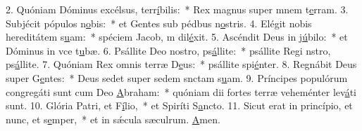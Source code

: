 2. Quóniam Dóminus excélsus, terr\uline{í}bilis:~* Rex magnus super mnem t\uline{e}rram.
3. Subjécit pópulos n\uline{o}bis:~* et Gentes sub pédbus n\uline{o}stris.
4. Elégit nobis hereditátem s\uline{u}am:~* spéciem Jacob, m dil\uline{é}xit.
5. Ascéndit Deus in j\uline{ú}bilo:~* et Dóminus in vce t\uline{u}bæ.
6. Psállite Deo nostro, ps\uline{á}llite:~* psállite Regi nstro, ps\uline{á}llite.
7. Quóniam Rex omnis terræ D\uline{e}us:~* psállite spi\uline{é}nter.
8. Regnábit Deus super G\uline{e}ntes:~* Deus sedet super sedem snctam s\uline{u}am.
9. Príncipes populórum congregáti sunt cum Deo \uline{A}braham:~* quóniam dii fortes terræ veheménter lev\uline{á}ti sunt.
10. Glória Patri, et F\uline{í}lio,~* et Spiríti S\uline{a}ncto.
11. Sicut erat in princípio, et nunc, et s\uline{e}mper,~* et in sǽcula sæculrum. \uline{A}men.
